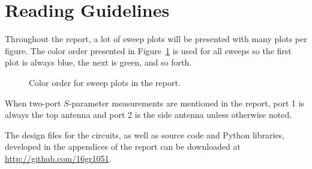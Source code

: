 \section*{Reading Guidelines}
Throughout the report, a lot of sweep plots will be presented with many plots per figure. The color order presented in Figure~\ref{fig:colororder} is used for all sweeps so the first plot is always blue, the next is green, and so forth.

\begin{figure}[htbp]
    \centering
    \caption{Color order for sweep plots in the report.}
    \label{fig:colororder}
\end{figure}

When two-port $S$-parameter measurements are mentioned in the report, port 1 is always the top antenna and port 2 is the side antenna unless otherwise noted.

The design files for the circuits, as well as source code and Python libraries, developed in the appendices of the report can be downloaded at \url{http://github.com/16gr1051}.

